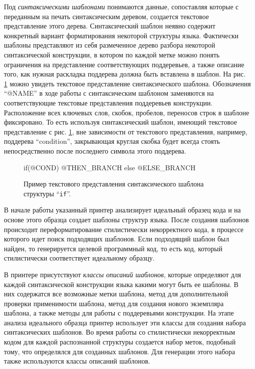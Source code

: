 \documentclass{matmex-diploma}
\begin{document}
Под \textit{синтаксическими шаблонами} понимаются данные, сопоставляя которые с переданным на печать синтаксическим деревом, создается текстовое представление этого дерева. Синтаксический шаблон неявно содержит конкретный вариант форматирования некоторой структуры языка. Фактически шаблоны представляют из себя размеченное дерево разбора некоторой синтаксической конструкции, в котором по каждой метке можно понять ограничения на представление соответствующих поддеревьев, а также описание того, как нужная раскладка поддерева должна быть вставлена в шаблон. На рис. \ref{ifTemplate} можно увидеть текстовое представление синтаксического шаблона. Обозначения “@NAME” в ходе работы с синтаксическим шаблоном заменяются на соответствующие текстовые представления поддеревьев конструкции. Расположение всех ключевых слов, скобок, пробелов, переносов строк в шаблоне фиксировано. То есть используя синтаксический шаблон, имеющий текстовое представление с рис. \ref{ifTemplate}, вне зависимости от текстового представления, например, поддерева “condition”, закрывающая круглая скобка будет всегда стоять непосредственно после последнего символа этого поддерева.

\begin{figure}[ht]
    \begin{pyglist}[language=java,numbers=left,numbersep=5pt]
    if(@COND) {
        @THEN_BRANCH
    }
    else {
        @ELSE_BRANCH
    }
    \end{pyglist}
\caption{Пример текстового представления синтаксического шаблона структуры “\lstinline{if}”.}    
\label{ifTemplate}
\end{figure}

В начале работы указанный принтер анализирует идеальный образец кода и на основе этого образца создает шаблоны структур языка. После создания шаблонов происходит переформатирование стилистически некорректного кода, в процессе которого идет поиск подходящих шаблонов. Если подходящий шаблон был найден, то генерируется целевой программный код, то есть код, который стилистически соответствует идеальному образцу.

В принтере присутствуют \textit{классы описаний шаблонов}, которые определяют для каждой синтаксической конструкции языка какими могут быть ее шаблоны. В них содержатся все возможные метки шаблона, метод для дополнительной проверки применимости шаблона, метод для создания нового экземпляра шаблона, а также методы для работы с поддеревьями конструкции. На этапе анализа идеального образца принтер использует эти классы для создания набора синтаксических шаблонов. Во время работы со стилистически некорректным кодом для каждой распознанной структуры создается набор меток, подобный тому, что определялся для созданных шаблонов. Для генерации этого набора также используются классы описаний шаблонов.
\end{document}
